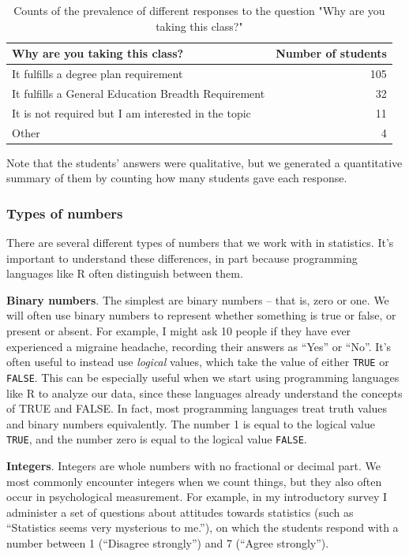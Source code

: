 \documentclass[12pt,]{book}
\theoremstyle{definition}
\theoremstyle{definition}
\theoremstyle{definition}
\theoremstyle{remark}
\begin{document}
\begin{table}

\caption{\label{tab:WhyTakingClass}Counts of the prevalence of different responses to the question "Why are you taking this class?"}
\centering
\begin{tabular}[t]{lr}
\toprule
Why are you taking this class? & Number of students\\
\midrule
It fulfills a degree plan requirement & 105\\
It fulfills a General Education Breadth Requirement & 32\\
It is not required but I am interested in the topic & 11\\
Other & 4\\
\bottomrule
\end{tabular}
\end{table}

Note that the students' answers were qualitative, but we generated a quantitative summary of them by counting how many students gave each response.

\hypertarget{types-of-numbers}{%
\subsubsection{Types of numbers}\label{types-of-numbers}}

There are several different types of numbers that we work with in statistics. It's important to understand these differences, in part because programming languages like R often distinguish between them.

\textbf{Binary numbers}. The simplest are binary numbers -- that is, zero or one. We will often use binary numbers to represent whether something is true or false, or present or absent. For example, I might ask 10 people if they have ever experienced a migraine headache, recording their answers as ``Yes'' or ``No''. It's often useful to instead use \emph{logical} values, which take the value of either \texttt{TRUE} or \texttt{FALSE}. This can be especially useful when we start using programming languages like R to analyze our data, since these languages already understand the concepts of TRUE and FALSE. In fact, most programming languages treat truth values and binary numbers equivalently. The number 1 is equal to the logical value \texttt{TRUE}, and the number zero is equal to the logical value \texttt{FALSE}.

\textbf{Integers}. Integers are whole numbers with no fractional or decimal part. We most commonly encounter integers when we count things, but they also often occur in psychological measurement. For example, in my introductory survey I administer a set of questions about attitudes towards statistics (such as ``Statistics seems very mysterious to me.''), on which the students respond with a number between 1 (``Disagree strongly'') and 7 (``Agree strongly'').
\end{document}
